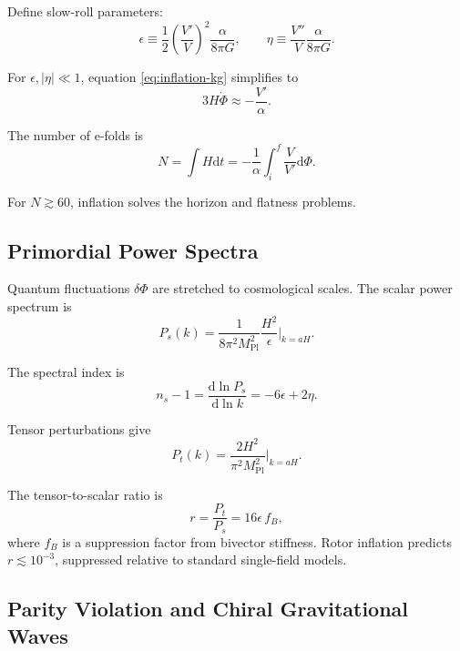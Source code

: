\documentclass[11pt,a4paper]{article}
\numberwithin{equation}{section}
\theoremstyle{plain}
\theoremstyle{definition}
\theoremstyle{remark}
\newcommand{\dd}{\mathrm{d}}
\begin{document}
Define slow-roll parameters:
\begin{equation}
\epsilon \equiv \frac{1}{2}\left(\frac{V'}{V}\right)^2\frac{\alpha}{8\pi G}, \qquad \eta \equiv \frac{V''}{V}\frac{\alpha}{8\pi G}.
\label{eq:slow-roll-params}
\end{equation}

For $\epsilon, |\eta| \ll 1$, equation \eqref{eq:inflation-kg} simplifies to
\begin{equation}
3H\dot{\Phi} \approx -\frac{V'}{\alpha}.
\end{equation}

The number of e-folds is
\begin{equation}
N = \int H\dd t = -\frac{1}{\alpha}\int_{i}^{f} \frac{V}{V'}\dd\Phi.
\label{eq:efolds}
\end{equation}

For $N \gtrsim 60$, inflation solves the horizon and flatness problems.

\subsection{Primordial Power Spectra}

Quantum fluctuations $\delta\Phi$ are stretched to cosmological scales. The scalar power spectrum is
\begin{equation}
P_s(k) = \frac{1}{8\pi^2 M_{\mathrm{Pl}}^2}\frac{H^2}{\epsilon}\bigg|_{k=aH}.
\label{eq:scalar-spectrum}
\end{equation}

The spectral index is
\begin{equation}
n_s - 1 = \frac{\dd\ln P_s}{\dd\ln k} = -6\epsilon + 2\eta.
\label{eq:spectral-index}
\end{equation}

Tensor perturbations give
\begin{equation}
P_t(k) = \frac{2H^2}{\pi^2 M_{\mathrm{Pl}}^2}\bigg|_{k=aH}.
\end{equation}

The tensor-to-scalar ratio is
\begin{equation}
r = \frac{P_t}{P_s} = 16\epsilon\, f_B,
\label{eq:tensor-ratio}
\end{equation}
where $f_B$ is a suppression factor from bivector stiffness. Rotor inflation predicts $r \lesssim 10^{-3}$, suppressed relative to standard single-field models.

\subsection{Parity Violation and Chiral Gravitational Waves}
\end{document}
